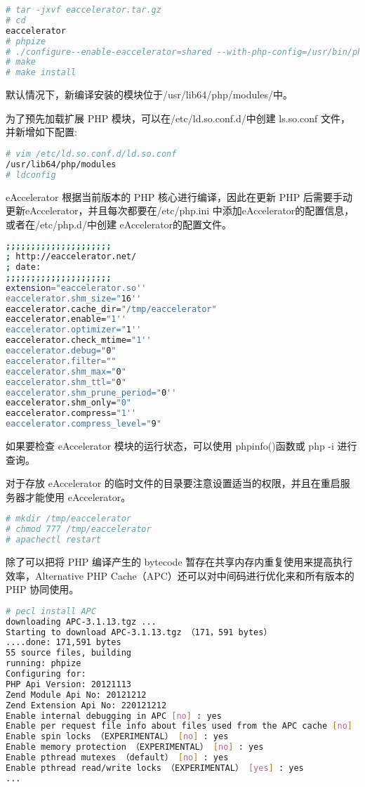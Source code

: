 \begin{lstlisting}[language=bash]
# tar -jxvf eaccelerator.tar.gz
# cd
eaccelerator
# phpize
# ./configure--enable-eaccelerator=shared --with-php-config=/usr/bin/php-config
# make
# make install
\end{lstlisting}


默认情况下，新编译安装的模块位于/usr/lib64/php/modules/中。

为了预先加载扩展 PHP 模块，可以在/etc/ld.so.conf.d/中创建 ls.so.conf 文件，并新增如下配置:



\begin{lstlisting}[language=bash]
# vim /etc/ld.so.conf.d/ld.so.conf
/usr/lib64/php/modules
# ldconfig
\end{lstlisting}

eAccelerator 根据当前版本的 PHP 核心进行编译，因此在更新 PHP 后需要手动更新eAccelerator，并且每次都要在/etc/php.ini 中添加eAccelerator的配置信息，或者在/etc/php.d/中创建 eAccelerator的配置文件。




\begin{lstlisting}[language=bash]
;;;;;;;;;;;;;;;;;;;;;
; http://eaccelerator.net/
; date:
;;;;;;;;;;;;;;;;;;;;;
extension="eaccelerator.so''
eaccelerator.shm_size="16''
eaccelerator.cache_dir="/tmp/eaccelerator"
eaccelerator.enable="1''
eaccelerator.optimizer="1''
eaccelerator.check_mtime="1''
eaccelerator.debug="0"
eaccelerator.filter=""
eaccelerator.shm_max="0"
eaccelerator.shm_ttl="0"
eaccelerator.shm_prune_period="0''
eaccelerator.shm_only="0"
eaccelerator.compress="1''
eaccelerator.compress_level="9"
\end{lstlisting}


如果要检查 eAccelerator 模块的运行状态，可以使用 phpinfo()函数或 php -i 进行查询。

对于存放 eAccelerator 的临时文件的目录要注意设置适当的权限，并且在重启服务器才能使用 eAccelerator。



\begin{lstlisting}[language=bash]
# mkdir /tmp/eaccelerator
# chmod 777 /tmp/eaccelerator
# apachectl restart
\end{lstlisting}


除了可以把将 PHP 编译产生的 bytecode 暂存在共享内存内重复使用来提高执行效率，Alternative PHP Cache（APC）还可以对中间码进行优化来和所有版本的 PHP 协同使用。



\begin{lstlisting}[language=bash]
# pecl install APC
downloading APC-3.1.13.tgz ...
Starting to download APC-3.1.13.tgz （171，591 bytes）
....done: 171,591 bytes
55 source files, building
running: phpize
Configuring for:
PHP Api Version: 20121113
Zend Module Api No: 20121212
Zend Extension Api No: 220121212
Enable internal debugging in APC [no] : yes
Enable per request file info about files used from the APC cache [no] : yes
Enable spin locks （EXPERIMENTAL） [no] : yes
Enable memory protection （EXPERIMENTAL） [no] : yes
Enable pthread mutexes （default） [no] : yes
Enable pthread read/write locks （EXPERIMENTAL） [yes] : yes
...
\end{lstlisting}

